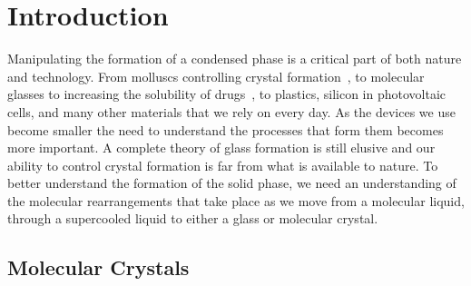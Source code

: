 
\chapter{Introduction}


Manipulating the formation of a condensed phase is a critical part of both nature and technology. From molluscs controlling crystal formation~\cite{de-yoreo:03}, to molecular glasses to increasing the solubility of drugs~\cite{hancock:00}, to plastics\tocite, silicon in photovoltaic cells\tocite, and many other materials that we rely on every day. As the devices we use become smaller the need to understand the processes that form them becomes more important. A complete theory of glass formation is still elusive and our ability to control crystal formation is far from what is available to nature. To better understand the formation of the solid phase, we need an understanding of the molecular rearrangements that take place as we move from a molecular liquid, through a supercooled liquid to either a glass or molecular crystal.

\section{Molecular Crystals}

